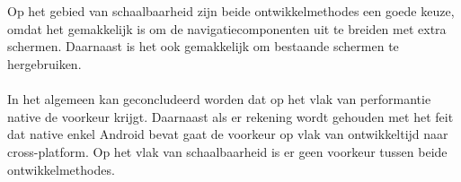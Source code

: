 \\\\
Op het gebied van schaalbaarheid zijn beide ontwikkelmethodes een goede keuze, 
omdat het gemakkelijk is om de navigatiecomponenten uit te breiden met extra schermen. 
Daarnaast is het ook gemakkelijk om bestaande schermen te hergebruiken.
\\\\
In het algemeen kan geconcludeerd worden dat op het vlak van performantie native de 
voorkeur krijgt. Daarnaast als er rekening wordt gehouden met het feit dat 
native enkel Android bevat gaat de voorkeur op vlak van ontwikkeltijd naar cross-platform.
Op het vlak van schaalbaarheid is er geen voorkeur tussen beide ontwikkelmethodes.




















